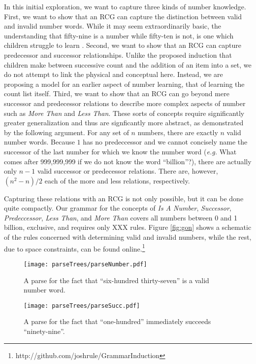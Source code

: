 \documentclass[10pt,letterpaper]{article}
\begin{document}
In this initial exploration, we want to capture three kinds of number
knowledge. First, we want to show that an RCG can capture the
distinction between valid and invalid number words. While it may seem
extraordinarily basic, the understanding that fifty-nine is a number
while fifty-ten is not, is one which children struggle to learn
\citep{FusRicBriar1982}.  Second, we want to show that an RCG can
capture predecessor and successor relationships. Unlike the proposed
induction that children make between successive count and the addition
of an item into a set, we do not attempt to link the physical and
conceptual here. Instead, we are proposing a model for an earlier
aspect of number learning, that of learning the count list
itself. Third, we want to show that an RCG can go beyond mere
successor and predecessor relations to describe more complex aspects
of number such as \emph{More Than} and \emph{Less Than}. These sorts
of concepts require significantly greater generalization and thus are
signficantly more abstract, as demonstrated by the following
argument. For any set of $n$ numbers, there are exactly $n$ valid
number words. Because $1$ has no predeccessor and we cannot concisely
name the successor of the last number for which we know the number
word ({\it e.g.}  What comes after 999,999,999 if we do not know the
word ``billion''?), there are actually only $n-1$ valid successor or
predecessor relations. There are, however, $(n^2-n)/2$ each of
the more and less relations, respectively.

Capturing these relations with an RCG is not only possible, but it can
be done quite compactly. Our grammar for the concepts of \emph{Is A
  Number}, \emph{Successor}, \emph{Predeccessor}, \emph{Less Than},
and \emph{More Than} covers all numbers between 0 and 1 billion,
exclusive, and requires only XXX rules. Figure \ref{fig:gon} shows a
schematic of the rules concerned with determining valid and invalid
numbers, while the rest, due to space constraints, can be found
online.\footnote{http://github.com/joshrule/GrammarInduction}

\begin{figure*}[t]
		\texttt{[image: parseTrees/parseNumber.pdf]}
		\caption{A parse for the fact that ``six-hundred thirty-seven'' is a valid number word.}
		\label{fig:parseNumber}
\end{figure*}

\begin{figure*}[t]
		\texttt{[image: parseTrees/parseSucc.pdf]}
		\caption{A parse for the fact that ``one-hundred'' immediately succeeds ``ninety-nine''.}
		\label{fig:parseSucc}
\end{figure*}
\end{document}
